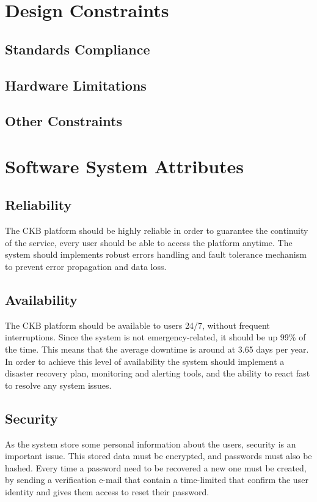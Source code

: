 \section{Design Constraints}
\subsection{Standards Compliance}
\subsection{Hardware Limitations}
\subsection{Other Constraints}

\section{Software System Attributes}
\subsection{Reliability}
The CKB platform should be highly reliable in order to guarantee the continuity of the service, every user should be able to access the platform anytime. The system should implements robust errors handling and fault tolerance mechanism to prevent error propagation and data loss. \subsection{Availability}
The CKB platform should be available to users 24/7, without frequent interruptions. 
Since the system is not emergency-related, it should be up 99\% of the time.
This means that the average downtime is around at 3.65 days per year. \newline
In order to achieve this level of availability the system should implement a disaster recovery plan, monitoring and alerting tools, and the ability to react fast to resolve any system issues.
\subsection{Security}
As the system store some personal information about the users, security is an important issue. This stored data must be encrypted, and passwords must also be hashed. \newline
Every time a password need to be recovered a new one must be created, by sending a verification e-mail that contain a time-limited that confirm the user identity and gives them access to reset their password.
